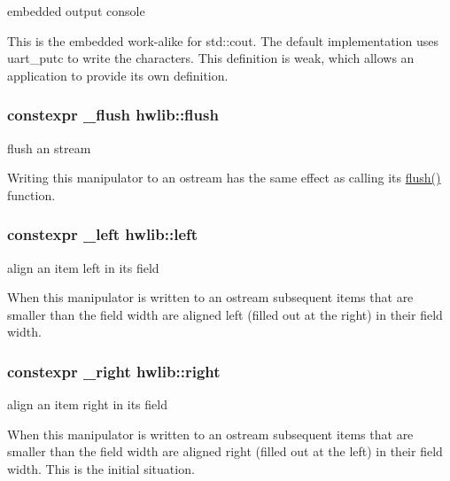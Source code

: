 embedded output console 

This is the embedded work-\/alike for std\+::cout. The default implementation uses uart\+\_\+putc to write the characters. This definition is weak, which allows an application to provide its own definition. 
\subsubsection[{\texorpdfstring{flush}{flush}}]{\setlength{\rightskip}{0pt plus 5cm}constexpr \+\_\+flush hwlib\+::flush}\hypertarget{hwlib-ostream_01-_01_copy_8hpp_file_a648fe94ca9899747a632c23f97007732}{}\label{hwlib-ostream_01-_01_copy_8hpp_file_a648fe94ca9899747a632c23f97007732}


flush an stream 

Writing this manipulator to an ostream has the same effect as calling its \hyperlink{hwlib-ostream_01-_01_copy_8hpp_a648fe94ca9899747a632c23f97007732}{flush()} function. 
\subsubsection[{\texorpdfstring{left}{left}}]{\setlength{\rightskip}{0pt plus 5cm}constexpr \+\_\+left hwlib\+::left}\hypertarget{hwlib-ostream_01-_01_copy_8hpp_file_a7d9a4ef3e66da75048c5b3e67cf401d8}{}\label{hwlib-ostream_01-_01_copy_8hpp_file_a7d9a4ef3e66da75048c5b3e67cf401d8}


align an item left in its field 

When this manipulator is written to an ostream subsequent items that are smaller than the field width are aligned left (filled out at the right) in their field width. 
\subsubsection[{\texorpdfstring{right}{right}}]{\setlength{\rightskip}{0pt plus 5cm}constexpr \+\_\+right hwlib\+::right}\hypertarget{hwlib-ostream_01-_01_copy_8hpp_file_a26a6aead1d4dc1a990ab77bf2b730740}{}\label{hwlib-ostream_01-_01_copy_8hpp_file_a26a6aead1d4dc1a990ab77bf2b730740}


align an item right in its field 

When this manipulator is written to an ostream subsequent items that are smaller than the field width are aligned right (filled out at the left) in their field width. This is the initial situation. 